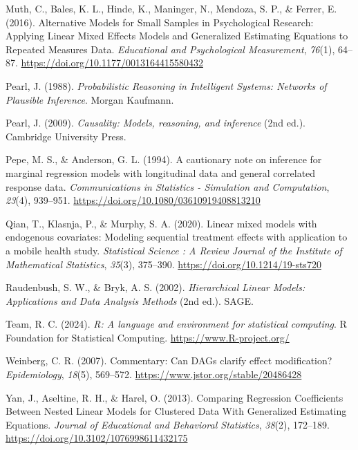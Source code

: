 \documentclass[
  12pt,
  a4paper,
]{article}
\newlength{\cslhangindent}
\newenvironment{CSLReferences}[2] %
 {\begin{list}{}{%
  \setlength{\itemindent}{0pt}
  \setlength{\leftmargin}{0pt}
  \setlength{\parsep}{0pt}
  \ifodd #1
   \setlength{\leftmargin}{\cslhangindent}
   \setlength{\itemindent}{-1\cslhangindent}
  \fi
  \setlength{\itemsep}{#2\baselineskip}}}
 {\end{list}}
\begin{document}
\begin{CSLReferences}{1}{0}
Muth, C., Bales, K. L., Hinde, K., Maninger, N., Mendoza, S. P., \&
Ferrer, E. (2016). Alternative Models for Small Samples in Psychological
Research: Applying Linear Mixed Effects Models and Generalized
Estimating Equations to Repeated Measures Data. \emph{Educational and
Psychological Measurement}, \emph{76}(1), 64--87.
\url{https://doi.org/10.1177/0013164415580432}

Pearl, J. (1988). \emph{Probabilistic Reasoning in Intelligent Systems:
Networks of Plausible Inference}. Morgan Kaufmann.

Pearl, J. (2009). \emph{Causality: Models, reasoning, and inference}
(2nd ed.). Cambridge University Press.

Pepe, M. S., \& Anderson, G. L. (1994). A cautionary note on inference
for marginal regression models with longitudinal data and general
correlated response data. \emph{Communications in Statistics -
Simulation and Computation}, \emph{23}(4), 939--951.
\url{https://doi.org/10.1080/03610919408813210}

Qian, T., Klasnja, P., \& Murphy, S. A. (2020). Linear mixed models with
endogenous covariates: Modeling sequential treatment effects with
application to a mobile health study. \emph{Statistical Science : A
Review Journal of the Institute of Mathematical Statistics},
\emph{35}(3), 375--390. \url{https://doi.org/10.1214/19-sts720}

Raudenbush, S. W., \& Bryk, A. S. (2002). \emph{Hierarchical Linear
Models: Applications and Data Analysis Methods} (2nd ed.). SAGE.

Team, R. C. (2024). \emph{R: A language and environment for statistical
computing}. R Foundation for Statistical Computing.
\url{https://www.R-project.org/}

Weinberg, C. R. (2007). Commentary: Can DAGs clarify effect
modification? \emph{Epidemiology}, \emph{18}(5), 569--572.
\url{https://www.jstor.org/stable/20486428}

Yan, J., Aseltine, R. H., \& Harel, O. (2013). Comparing Regression
Coefficients Between Nested Linear Models for Clustered Data With
Generalized Estimating Equations. \emph{Journal of Educational and
Behavioral Statistics}, \emph{38}(2), 172--189.
\url{https://doi.org/10.3102/1076998611432175}

\end{CSLReferences}
\end{document}
